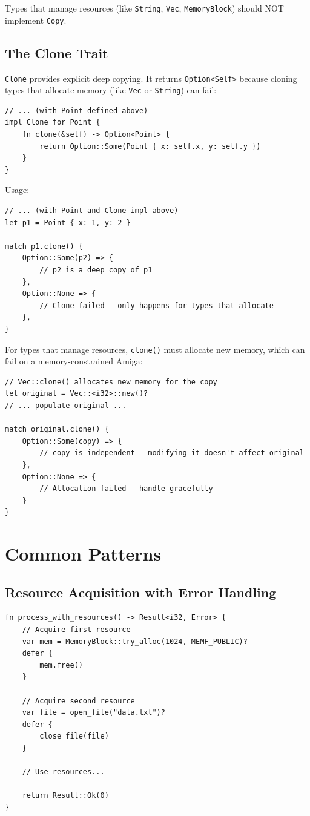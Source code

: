 Types that manage resources (like \texttt{String}, \texttt{Vec}, \texttt{MemoryBlock}) should NOT implement \texttt{Copy}.

\subsection{The Clone Trait}

\texttt{Clone} provides explicit deep copying. It returns \texttt{Option<Self>} because cloning types that allocate memory (like \texttt{Vec} or \texttt{String}) can fail:

\begin{lstlisting}
// ... (with Point defined above)
impl Clone for Point {
    fn clone(&self) -> Option<Point> {
        return Option::Some(Point { x: self.x, y: self.y })
    }
}
\end{lstlisting}

Usage:

\begin{lstlisting}
// ... (with Point and Clone impl above)
let p1 = Point { x: 1, y: 2 }

match p1.clone() {
    Option::Some(p2) => {
        // p2 is a deep copy of p1
    },
    Option::None => {
        // Clone failed - only happens for types that allocate
    },
}
\end{lstlisting}

For types that manage resources, \texttt{clone()} must allocate new memory, which can fail on a memory-constrained Amiga:

\begin{lstlisting}
// Vec::clone() allocates new memory for the copy
let original = Vec::<i32>::new()?
// ... populate original ...

match original.clone() {
    Option::Some(copy) => {
        // copy is independent - modifying it doesn't affect original
    },
    Option::None => {
        // Allocation failed - handle gracefully
    }
}
\end{lstlisting}

\section{Common Patterns}

\subsection{Resource Acquisition with Error Handling}

\begin{lstlisting}
fn process_with_resources() -> Result<i32, Error> {
    // Acquire first resource
    var mem = MemoryBlock::try_alloc(1024, MEMF_PUBLIC)?
    defer {
        mem.free()
    }

    // Acquire second resource
    var file = open_file("data.txt")?
    defer {
        close_file(file)
    }

    // Use resources...

    return Result::Ok(0)
}
\end{lstlisting}

